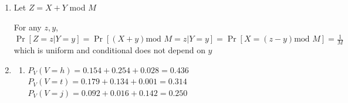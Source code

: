 \documentclass[12pt, a4paper]{article}
\begin{document}
\begin{enumerate}[Q\arabic*.]
\begin{enumerate}
      \item Derivation:

      \item Derivation:

      \item Let $Z = \frac{1}{n}(X_1 + \dots + X_n)$,\\$\E[Z] = \frac{n(0)}{n} = 0$ and $\Var[Z] = \frac{1}{n^2}\Var[X_1 + \dots + X_n] = \frac{n\sigma^2}{n^2} = \frac{\sigma^2}{n}$

        Derivation:
    \end{enumerate}

  \item Let $Z = X+Y$ mod $M$

    For any $z,y$, $\Pr[Z=z|Y=y] = \Pr[(X+y)\text{mod } M = z | Y=y] = \Pr[X=(z-y)\text{mod }M] = \frac{1}{M}$ which is uniform and conditional does not depend on $y$

  \item
    \begin{enumerate}
      \item $P_V(V=h) = 0.154 + 0.254 + 0.028 = 0.436$\\ 
        $P_V(V=t) = 0.179 + 0.134 + 0.001 = 0.314$\\ 
        $P_V(V=j) = 0.092 + 0.016 + 0.142 = 0.250$


\end{enumerate}
\end{enumerate}
\end{document}
